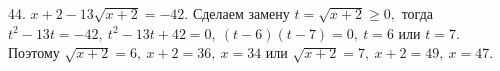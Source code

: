 44. $x+2-13\sqrt{x+2}=-42.$ Сделаем замену $t=\sqrt{x+2}\geqslant0,$ тогда $t^2-13t=-42,\ t^2-13t+42=0,\ (t-6)(t-7)=0,\ t=6$ или $t=7.$ Поэтому $\sqrt{x+2}=6,\ x+2=36,\ x=34$ или $\sqrt{x+2}=7,\ x+2=49,\ x=47.$\\
